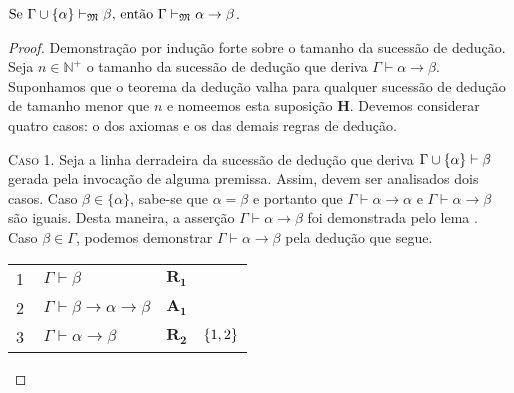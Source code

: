     \vspace{.5\baselineskip}
    \begin{tcolorbox}[enhanced jigsaw, breakable, sharp corners, colframe=black, colback=white, boxrule=0.5pt, left=1.5mm, right=1.5mm, top=1.5mm, bottom=1.5mm]
        \begin{theorem}[Dedução]\label{deduction}
            $\text{Se }\Gamma\cup\left\{\alpha\right\}\vdash_{\mathfrak{M}}\beta\text{, então }\Gamma\vdash_{\mathfrak{M}}\alpha\to\beta$.
        \begin{proof}
        Demonstração por indução forte sobre o tamanho da sucessão de dedução.
        Seja $n\in\mathbb{N}^+$ o tamanho da sucessão de dedução que deriva $\Gamma\vdash\alpha\to\beta$.
        Suponhamos que o teorema da dedução valha para qualquer sucessão de dedução de tamanho menor que $n$ e nomeemos esta suposição $\mathbf{H}$.
        Devemos considerar quatro casos: o dos axiomas e os das demais regras de dedução.
        
        \begin{case}
        \vspace{\baselineskip}
        \textsc{Caso 1.}
        Seja a linha derradeira da sucessão de dedução que deriva $\Gamma\cup\left\{\alpha\right\}\vdash\beta$ gerada pela invocação de alguma premissa.
        Assim, devem ser analisados dois casos.
        Caso $\beta\in\{\alpha\}$, sabe-se que $\alpha=\beta$ e portanto que $\Gamma\vdash\alpha\to\alpha$ e $\Gamma\vdash\alpha\to\beta$ são iguais.
        Desta maneira, a asserção $\Gamma\vdash\alpha\to\beta$ foi demonstrada pelo lema .
        Caso $\beta\in\Gamma$, podemos demonstrar $\Gamma\vdash\alpha\to\beta$ pela dedução que segue.

        \vspace{0.5\baselineskip}
        \footnotesize
        \setlength{\rowskip}{0.5\baselineskip}
        \begin{xltabular}{\textwidth}{r | X l l}
            \scriptsize{\phantom{0}1}\phantom{ } & $\ \Gamma\vdash\beta$                  & \hyperref[modal.rule.1]{$\mathbf{R_1}$}\phantom{1} & \\[\rowskip]
            \scriptsize{\phantom{0}2}\phantom{ } & $\ \Gamma\vdash\beta\to\alpha\to\beta$ & \hyperref[modal.axiom.1]{$\mathbf{A_1}$}           & \\[\rowskip]
            \scriptsize{\phantom{0}3}\phantom{ } & $\ \Gamma\vdash\alpha\to\beta$         & $\hyperref[modal.rule.2]{\mathbf{R_2}}$            & $\left\{1,2\right\}$
        \end{xltabular}
        \normalsize
        \end{case}


\end{proof}
\end{theorem}
\end{tcolorbox}
